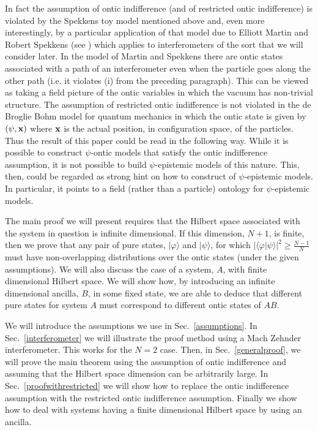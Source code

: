\documentclass[12pt]{article}
\begin{document}
In fact the assumption of ontic indifference (and of restricted ontic indifference) is violated by the Spekkens toy model mentioned above and, even more interestingly, by a particular application of that model due to Elliott Martin and Robert Spekkens (see \cite{spekkens2008why}) which applies to interferometers of the sort that we will consider later.  In the model of Martin and Spekkens there are ontic states associated with a path of an interferometer even when the particle goes along the other path (i.e. it violates (i) from the preceding paragraph).  This can be viewed as taking a field picture of the ontic variables in which the vacuum has non-trivial structure.  The assumption of restricted ontic indifference is not violated in the de Broglie Bohm model for quantum mechanics in which the ontic state is given by $(\psi, {\bf x})$ where $\bf x$ is the actual position, in configuration space, of the particles.  Thus the result of this paper could be read in the following way.  While it is possible to construct $\psi$-ontic models that satisfy the ontic indifference assumption, it is not possible to build $\psi$-epistemic models of this nature.  This, then, could be regarded as strong hint on how to construct of $\psi$-epistemic models.  In particular, it points to a field (rather than a particle) ontology for $\psi$-epistemic models.  

The main proof we will present requires that the Hilbert space associated with the system in question is infinite dimensional.   If this dimension, $N+1$, is finite, then we prove that any
pair of pure states, $|\varphi\rangle$ and $|\psi\rangle$, for which $|\langle \varphi| \psi\rangle|^2 \geq \frac{N-1}{N}$ must have non-overlapping distributions over the ontic states (under the given assumptions).   We
will also discuss the case of a system, $A$, with finite dimensional Hilbert space.  We will show how, by introducing an infinite dimensional ancilla, $B$, in some fixed state, we are able
to deduce that different pure states for system $A$ must correspond to different ontic states of $AB$.

We will introduce the assumptions we use in Sec.\ \ref{assumptions}.   In Sec.\ \ref{interferometer} we will illustrate the proof method using a Mach Zehnder interferometer.  This works for
the $N=2$ case.  Then, in Sec.\ \ref{generalproof}, we will prove the main theorem using the assumption of ontic indifference and assuming that the Hilbert space dimension can be arbitrarily
large.  In Sec.\ \ref{proofwithrestricted} we will show how to replace the ontic indifference assumption with the restricted ontic indifference assumption.  Finally we show how to deal with
systems having a finite dimensional Hilbert space by using an ancilla.
\end{document}
